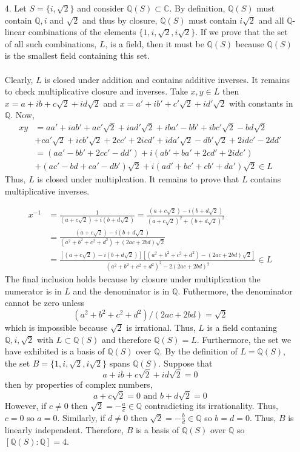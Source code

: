 \documentclass[12pt]{extarticle}
\newcommand{\C}{\mathbb{C}}
\newcommand{\Q}{\mathbb{Q}}
\begin{document}
\begin{enumerate}
\item[4. ] Let $S = \{i, \sqrt{2}\}$ and consider $\Q(S) \subset \C$. By definition, $\Q(S)$ must contain $\Q, i$ and $\sqrt{2}$ and thus by closure, $\Q(S)$ must contain $i \sqrt{2}$ and all $\Q$-linear combinations of the elements $\{1, i, \sqrt{2}, i \sqrt{2}\}$. If we prove that the set of all such combinations, $L$, is a field, then it must be $\Q(S)$ because $\Q(S)$ is the smallest field containing this set. \\ \\
Clearly, $L$ is closed under addition and contains additive inverses. It remains to check multiplicative closure and inverses. Take $x, y \in L$ then $x = a + ib + c \sqrt{2} + i d  \sqrt{2}$ and $x = a' + i b' + c' \sqrt{2} + i d' \sqrt{2}$ with constants in $\Q$. Now, 
\begin{align*}
xy & = aa' + i ab' + a c' \sqrt{2} + i a d' \sqrt{2} + i b a' - b b' + i b c' \sqrt{2} - b d \sqrt{2} \\  & + ca' \sqrt{2} + i cb' \sqrt{2} + 2 c c' + 2 i c d' + i d a' \sqrt{2} - d b' \sqrt{2} + 2i d c' - 2 dd' \\
 & = (aa' - bb'+ 2cc' - dd') + i(ab' + ba' + 2 cd' + 2idc') \\ & + (ac' - bd + ca'- db') \sqrt{2} + i (ad' + bc' + cb' + da') \sqrt{2} \in L 
\end{align*}
Thus, $L$ is closed under multiplcation. It remains to prove that $L$ contains multiplicative inverses.  

\begin{align*}
x^{-1} & = \frac{1}{(a + c \sqrt{2}) + i (b +  d \sqrt{2})} = \frac{(a + c \sqrt{2}) - i (b +  d \sqrt{2})}{(a + c \sqrt{2})^2 + (b +  d \sqrt{2})^2} \\ 
& = \frac{(a + c \sqrt{2}) - i (b +  d \sqrt{2})}{(a^2 + b^2 + c^2 + d^2) + (2ac + 2bd)\sqrt{2}} \\ 
& = \frac{\left[(a + c \sqrt{2}) - i (b +  d \sqrt{2})\right] \left[ (a^2 + b^2 + c^2 + d^2) - (2ac + 2bd)\sqrt{2} \right] }{(a^2 + b^2 + c^2 + d^2)^2 - 2 (2ac + 2bd)^2} \in L
\end{align*}
The final inclusion holds because by closure under multiplication the numerator is in $L$ and the denominator is in $\Q$. Futhermore, the denominator cannot be zero unless \[(a^2 + b^2 + c^2 + d^2)/(2ac + 2bd) = \sqrt{2}\] which is impossible because $\sqrt{2}$ is irrational. Thus, $L$ is a field contaning $\Q, i, \sqrt{2}$ with $L \subset \Q(S)$ and therefore $\Q(S) = L$. Furthermore, the set we have exhibited is a basis of $\Q(S)$ over $\Q$. By the definition of $L = \Q(S)$, the set $B = \{1, i, \sqrt{2}, i \sqrt{2}\}$ spans $\Q(S)$. Suppose that \[a + ib + c \sqrt{2} + i d \sqrt{2} = 0\] then by properties of complex numbers, \[a + c \sqrt{2} = 0 \text{ and } b + d \sqrt{2} = 0\] However, if $c \neq 0$ then $\sqrt{2} = - \frac{a}{c} \in \Q$ contradicting its irrationality. Thus, $c = 0$ so $a  = 0$. Similarly, if $d \neq 0$ then $\sqrt{2} = - \frac{b}{d} \in \Q$ so $b = d = 0$. Thus, $B$ is linearly independent. Therefore, $B$ is a basis of $\Q(S)$ over $\Q$ so $[\Q(S) : \Q] = 4$.    
\end{enumerate}
\end{document}
